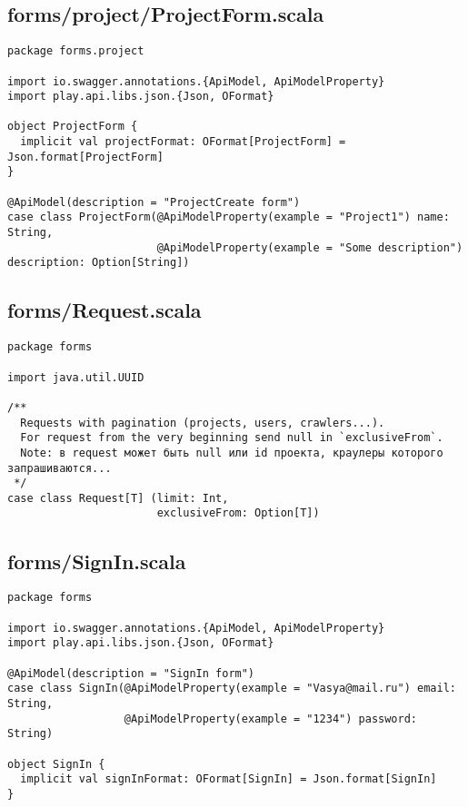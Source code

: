 \subsection{forms/project/ProjectForm.scala}
\begin{lstlisting}
package forms.project

import io.swagger.annotations.{ApiModel, ApiModelProperty}
import play.api.libs.json.{Json, OFormat}

object ProjectForm {
  implicit val projectFormat: OFormat[ProjectForm] = Json.format[ProjectForm]
}

@ApiModel(description = "ProjectCreate form")
case class ProjectForm(@ApiModelProperty(example = "Project1") name: String,
                       @ApiModelProperty(example = "Some description") description: Option[String])
\end{lstlisting}
\subsection{forms/Request.scala}
\begin{lstlisting}
package forms

import java.util.UUID

/**
  Requests with pagination (projects, users, crawlers...).
  For request from the very beginning send null in `exclusiveFrom`.
  Note: в request может быть null или id проекта, краулеры которого запрашиваются...
 */
case class Request[T] (limit: Int,
                       exclusiveFrom: Option[T])
\end{lstlisting}
\subsection{forms/SignIn.scala}
\begin{lstlisting}
package forms

import io.swagger.annotations.{ApiModel, ApiModelProperty}
import play.api.libs.json.{Json, OFormat}

@ApiModel(description = "SignIn form")
case class SignIn(@ApiModelProperty(example = "Vasya@mail.ru") email: String,
                  @ApiModelProperty(example = "1234") password: String)

object SignIn {
  implicit val signInFormat: OFormat[SignIn] = Json.format[SignIn]
}\end{lstlisting}
